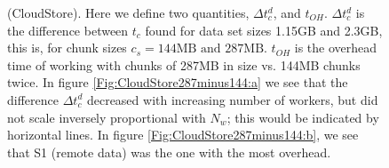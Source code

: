 \documentclass{rspublic}
\begin{document}
\begin{figure}
\begin{center}
\caption{(CloudStore). Here
we define two quantities, $\Delta t_c^d$, and $t_{OH}$. $\Delta t_c^d$
is the difference between $t_c$ found for data set sizes 1.15GB and
2.3GB, this is, for chunk sizes $c_s = 144\mbox{MB and } 287\mbox{MB}$.
$t_{OH}$ is the overhead time of working with chunks of 287MB in size
vs. 144MB chunks twice. In figure \ref{Fig:CloudStore287minus144:a} we
see that the difference $\Delta t_c^d$ decreased with increasing number of workers, but did
not scale inversely proportional with $N_w$; this would be indicated by horizontal lines. In figure
\ref{Fig:CloudStore287minus144:b}, we see that S1 (remote data)
was the one with the most overhead.}
\label{Fig:CloudStore287minus144}
\end{center}
\vspace{-0.4cm}
\end{figure}
\end{document}
